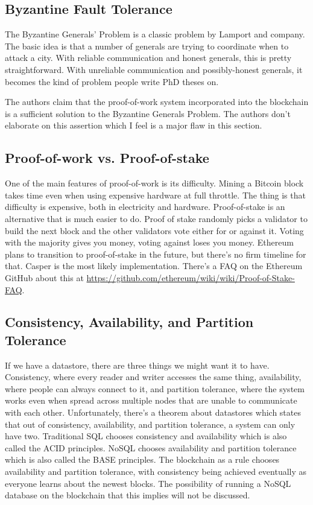 \documentclass{article}
\begin{document}
\subsection{Byzantine Fault Tolerance}
The Byzantine Generals' Problem is a classic problem by Lamport and company. The basic idea is that a number of generals are trying
to coordinate when to attack a city. With reliable communication and honest generals, this is pretty straightforward. With
unreliable communication and possibly-honest generals, it becomes the kind of problem people write PhD theses on.

The authors claim that the proof-of-work system incorporated into the blockchain is a sufficient solution to the Byzantine Generals Problem. The authors don't elaborate on this assertion which I feel is a major flaw in this section.

\subsection{Proof-of-work vs. Proof-of-stake}
One of the main features of proof-of-work is its difficulty. Mining a Bitcoin block takes time even when using expensive hardware
at full throttle. The thing is that difficulty is expensive, both in electricity and hardware. Proof-of-stake is an alternative that is
much easier to do. Proof of stake randomly picks a validator to build the next block and the other validators vote either for or
against it. Voting with the majority gives you money, voting against loses you money. Ethereum plans to transition to proof-of-stake
in the future, but there's no firm timeline for that. Casper is the most likely implementation. There's a FAQ on the Ethereum GitHub about this at \url{https://github.com/ethereum/wiki/wiki/Proof-of-Stake-FAQ}.

\subsection{Consistency, Availability, and Partition Tolerance}
If we have a datastore, there are three things we might want it to have. Consistency, where every reader and writer accesses
the same thing, availability, where people can always connect to it, and partition tolerance, where the system works even when spread across multiple nodes that are unable to communicate with each other. Unfortunately, there's a theorem about datastores which states that out of consistency, availability, and partition tolerance, a system can only have two. Traditional SQL chooses consistency and availability which is also called the ACID principles. NoSQL chooses availability and partition tolerance which is also called the BASE principles. The blockchain as a rule chooses availability and partition tolerance, with consistency being achieved eventually as everyone learns about the newest blocks. The possibility of running a NoSQL database on the blockchain that this implies will not be discussed.
\end{document}
